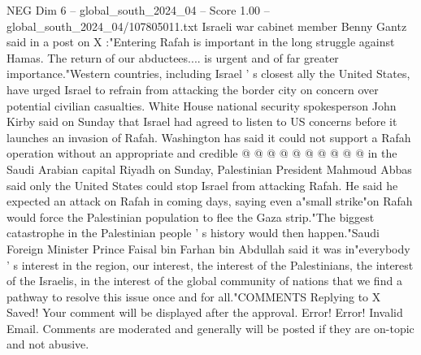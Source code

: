 \begin{textsample}{NEG Dim 6 – global\_south\_2024\_04 – Score 1.00 – global\_south\_2024\_04/107805011.txt}
Israeli war cabinet member Benny Gantz said in a post on X :"Entering Rafah is important in the long struggle against Hamas.
The return of our abductees.... is urgent and of far greater importance."Western countries, including Israel ' s closest ally the United States, have urged Israel to refrain from attacking the border city on concern over potential civilian casualties.
White House national security spokesperson John Kirby said on Sunday that Israel had agreed to listen to US concerns before it launches an invasion of Rafah.
Washington has said it could not support a Rafah operation without an appropriate and credible @ @ @ @ @ @ @ @ @ @ in the Saudi Arabian capital Riyadh on Sunday, Palestinian President Mahmoud Abbas said only the United States could stop Israel from attacking Rafah.
He said he expected an attack on Rafah in coming days, saying even a"small strike"on Rafah would force the Palestinian population to flee the Gaza strip."The biggest catastrophe in the Palestinian people ' s history would then happen."Saudi Foreign Minister Prince Faisal bin Farhan bin Abdullah said it was in"everybody ' s interest in the region, our interest, the interest of the Palestinians, the interest of the Israelis, in the interest of the global community of nations that we find a pathway to resolve this issue once and for all."COMMENTS Replying to X Saved!
Your comment will be displayed after the approval.
Error!
Error!
Invalid Email.
Comments are moderated and generally will be posted if they are on-topic and not abusive.

\end{textsample}
